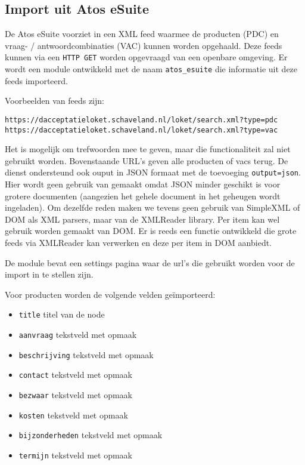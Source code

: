 \subsection{Import uit Atos eSuite}

De Atos eSuite voorziet in een XML feed waarmee de producten (PDC) en \\ vraag- / antwoordcombinaties (VAC) kunnen worden opgehaald. Deze feeds kunnen via een \texttt{HTTP GET} worden opgevraagd van een openbare omgeving.
Er wordt een module ontwikkeld met de naam \texttt{atos\_esuite} die informatie uit deze feeds importeerd.

Voorbeelden van feeds zijn:
\begin{verbatim}
https://dacceptatieloket.schaveland.nl/loket/search.xml?type=pdc
https://dacceptatieloket.schaveland.nl/loket/search.xml?type=vac
\end{verbatim}
Het is mogelijk om trefwoorden mee te geven, maar die functionaliteit zal niet gebruikt worden. Bovenstaande URL's geven alle producten of vacs terug.
De dienst ondersteund ook ouput in JSON formaat met de toevoeging \texttt{output=json}. Hier wordt geen gebruik van gemaakt omdat JSON minder geschikt is voor grotere documenten (aangezien het gehele document in het geheugen wordt ingeladen). Om dezelfde reden maken we tevens geen gebruik van SimpleXML of DOM als XML parsers, maar van de XMLReader library. Per item kan wel gebruik worden gemaakt van DOM. Er is reeds een functie ontwikkeld die grote feeds via XMLReader kan verwerken en deze per item in DOM aanbiedt.

De module bevat een settings pagina waar de url's die gebruikt worden voor de import in te stellen zijn.

Voor producten worden de volgende velden ge\"{i}mporteerd:
\begin{itemize}
\item \texttt{title} titel van de node
\item \texttt{aanvraag} tekstveld met opmaak
\item \texttt{beschrijving} tekstveld met opmaak
\item \texttt{contact} tekstveld met opmaak
\item \texttt{bezwaar} tekstveld met opmaak
\item \texttt{kosten} tekstveld met opmaak
\item \texttt{bijzonderheden} tekstveld met opmaak
\item \texttt{termijn} tekstveld met opmaak
\end{itemize}

